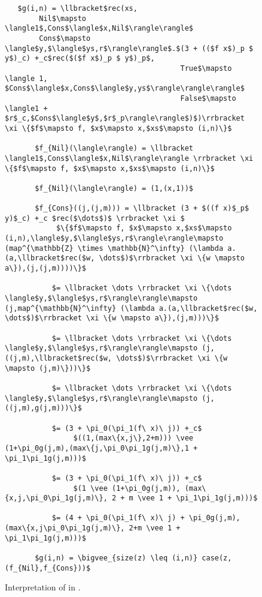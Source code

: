 \begin{figure}[H]
  \caption{Interpretation of  in .}
  \label{fig:interp_sizes_outer_rec}
  \begin{lstlisting}
   $g(i,n) = \llbracket$rec(xs,
        Nil$\mapsto \langle1$,Cons$\langle$x,Nil$\rangle\rangle$
        Cons$\mapsto \langle$y,$\langle$ys,r$\rangle\rangle$.$(3 + (($f x$)_p $ y$)_c) +_c$rec($($f x$)_p $ y$)_p$,
                                         True$\mapsto \langle 1, $Cons$\langle$x,Cons$\langle$y,ys$\rangle\rangle\rangle$
                                         False$\mapsto \langle1 + $r$_c,$Cons$\langle$y$,$r$_p\rangle\rangle$)$)\rrbracket \xi \{$f$\mapsto f, $x$\mapsto x,$xs$\mapsto (i,n)\}$

       $f_{Nil}(\langle\rangle) = \llbracket \langle1$,Cons$\langle$x,Nil$\rangle\rangle \rrbracket \xi \{$f$\mapsto f, $x$\mapsto x,$xs$\mapsto (i,n)\}$

       $f_{Nil}(\langle\rangle) = (1,(x,1))$

       $f_{Cons}((j,(j,m))) = \llbracket (3 + $((f x)$_p$ y)$_c) +_c $rec($\dots$)$ \rrbracket \xi $
            $\{$f$\mapsto f, $x$\mapsto x,$xs$\mapsto (i,n),\langle$y,$\langle$ys,r$\rangle\rangle\mapsto (map^{\mathbb{Z} \times \mathbb{N}^\infty} (\lambda a.(a,\llbracket$rec($w, \dots$)$\rrbracket \xi \{w \mapsto a\}),(j,(j,m))))\}$

           $= \llbracket \dots \rrbracket \xi \{\dots \langle$y,$\langle$ys,r$\rangle\rangle\mapsto (j,map^{\mathbb{N}^\infty} (\lambda a.(a,\llbracket$rec($w, \dots$)$\rrbracket \xi \{w \mapsto a\}),(j,m)))\}$

           $= \llbracket \dots \rrbracket \xi \{\dots \langle$y,$\langle$ys,r$\rangle\rangle\mapsto (j,((j,m),\llbracket$rec($w, \dots$)$\rrbracket \xi \{w \mapsto (j,m)\}))\}$

           $= \llbracket \dots \rrbracket \xi \{\dots \langle$y,$\langle$ys,r$\rangle\rangle\mapsto (j,((j,m),g(j,m)))\}$

           $= (3 + \pi_0(\pi_1(f\ x)\ j)) +_c$
                $((1,(max\{x,j\},2+m))) \vee (1+\pi_0g(j,m),(max\{j,\pi_0\pi_1g(j,m)\},1 + \pi_1\pi_1g(j,m)))$

           $= (3 + \pi_0(\pi_1(f\ x)\ j)) +_c$
                $(1 \vee (1+\pi_0g(j,m)), (max\{x,j,\pi_0\pi_1g(j,m)\}, 2 + m \vee 1 + \pi_1\pi_1g(j,m)))$

           $= (4 + \pi_0(\pi_1(f\ x)\ j) + \pi_0g(j,m), (max\{x,j\pi_0\pi_1g(j,m)\}, 2+m \vee 1 + \pi_1\pi_1g(j,m)))$

       $g(i,n) = \bigvee_{size(z) \leq (i,n)} case(z, (f_{Nil},f_{Cons}))$
  \end{lstlisting}
\end{figure}

